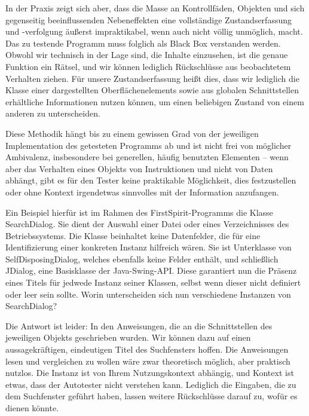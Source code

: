 In der Praxis zeigt sich aber, dass die Masse an Kontrollfäden, Objekten und
sich gegenseitig beeinflussenden Nebeneffekten eine vollständige Zustandserfassung
und -verfolgung äußerst impraktikabel, wenn auch nicht völlig unmöglich, macht.
Das zu testende Programm muss folglich als \glqq{}Black Box\grqq{} verstanden werden.
Obwohl wir technisch in der Lage sind, die Inhalte einzusehen, ist die genaue
Funktion ein Rätsel, und wir können lediglich Rückschlüsse aus beobachtetem
Verhalten ziehen. Für unsere Zustandserfassung heißt dies, dass wir lediglich
die Klasse einer dargestellten Oberflächenelements sowie aus globalen
Schnittstellen erhältliche Informationen nutzen können, um einen beliebigen Zustand
von einem anderen zu unterscheiden. 

Diese Methodik hängt bis zu einem gewissen Grad von der jeweiligen Implementation 
des getesteten Programms ab und ist nicht frei von möglicher Ambivalenz,
insbesondere bei generellen, häufig benutzten Elementen -- wenn aber
das Verhalten eines Objekts von Instruktionen und nicht von Daten abhängt,
gibt es für den Tester keine praktikable Möglichkeit, dies festzustellen
oder ohne Kontext irgendetwas sinnvolles mit der Information anzufangen.

Ein Beispiel hierfür ist im Rahmen des FirstSpirit-Programms die Klasse
\glqq{}SearchDialog\grqq{}. Sie dient der Auswahl einer Datei oder eines Verzeichnisses
des Betriebssystems. Die Klasse beinhaltet keine Datenfelder, die für
eine Identifizierung einer konkreten Instanz hilfreich wären. Sie ist
Unterklasse von \glqq{}SelfDisposingDialog\grqq{}, welches ebenfalls keine Felder
enthält, und schließlich \glqq{}JDialog\grqq{}, eine Basisklasse der Java-Swing-API.
Diese garantiert nun die Präsenz eines Titels für jedwede Instanz
seiner Klassen, selbst wenn dieser nicht definiert oder leer sein sollte.
Worin unterscheiden sich nun verschiedene Instanzen von \glqq{}SearchDialog\grqq{}?

Die Antwort ist leider: In den Anweisungen, die an die Schnittstellen
des jeweiligen Objekts geschrieben wurden. Wir können dazu auf einen
aussagekräftigen, eindeutigen Titel des Suchfensters hoffen. Die
Anweisungen lesen und vergleichen zu wollen wäre zwar theoretisch
möglich, aber praktisch nutzlos. Die Instanz ist von Ihrem Nutzungskontext
abhängig, und Kontext ist etwas, dass der Autotester nicht verstehen kann.
Lediglich die Eingaben, die zu dem Suchfenster geführt haben,
lassen weitere Rückschlüsse darauf zu, wofür es dienen könnte.

